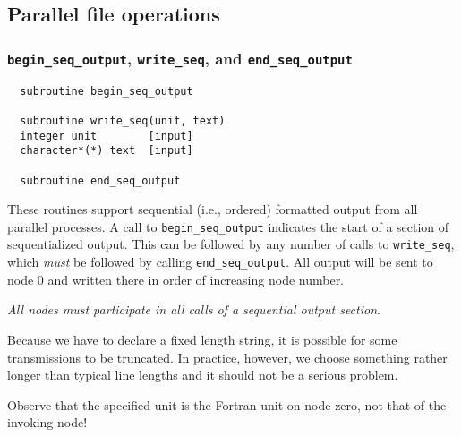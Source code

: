 \subsection{Parallel file operations}

\subsubsection{{\tt begin\_seq\_output}, {\tt write\_seq}, and {\tt end\_seq\_output}}
\begin{verbatim}
  subroutine begin_seq_output

  subroutine write_seq(unit, text)
  integer unit        [input]
  character*(*) text  [input]

  subroutine end_seq_output
\end{verbatim}
These routines support sequential (i.e., ordered) formatted output
from all parallel processes.  A call to \verb+begin_seq_output+
indicates the start of a section of sequentialized output.  This can
be followed by any number of calls to \verb+write_seq+, which {\em
  must} be followed by calling \verb+end_seq_output+.  All output will
be sent to node 0 and written there in order of increasing node
number.

{\em All nodes must participate in all calls of a sequential output section}.

Because we have to declare a fixed length string, it is possible for
some transmissions to be truncated.  In practice, however, we choose
something rather longer than typical line lengths and it should not be
a serious problem.

Observe that the specified unit is the Fortran unit on node zero, not
that of the invoking node!

